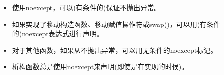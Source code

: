\begin{itemize}
	\item 使用noexcept，可以(有条件的)保证不抛出异常。
	\item 如果实现了移动构造函数、移动赋值操作符或swap()，可以用(有条件的)noexcept表达式进行声明。
	\item 对于其他函数，如果从不抛出异常，可以用无条件的noexcept标记。
	\item 析构函数总是使用noexcept来声明(即使是在实现的时候)。
\end{itemize}


